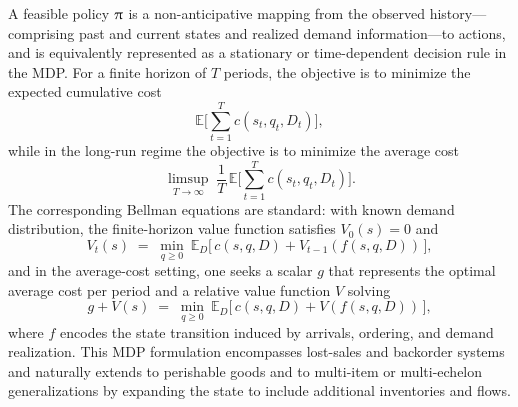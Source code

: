 A feasible policy $\uppi$ is a non-anticipative mapping from the observed history—comprising past and current states and realized demand information—to actions, and is equivalently represented as a stationary or time-dependent decision rule in the MDP. For a finite horizon of $T$ periods, the objective is to minimize the expected cumulative cost 
$$
\mathds{E}\Bigg[\sum_{t=1}^T c(s_t, q_t, D_t)\Bigg],
$$ 
while in the long-run regime the objective is to minimize the average cost 
\[
\limsup_{T\to\infty} \; \frac{1}{T} \,\mathds{E}\Bigg[\sum_{t=1}^T c(s_t, q_t, D_t)\Bigg].
\]
The corresponding Bellman equations are standard: with known demand distribution, the finite-horizon value function satisfies $V_0(s) = 0$ and
\[
V_t(s) \;=\; \min_{q \ge 0} \ \mathds{E}_D\big[\, c(s, q, D) + V_{t-1}(f(s, q, D)) \,\big],
\]
and in the average-cost setting, one seeks a scalar $g$ that represents the optimal average cost per period and a relative value function $V$ solving
\[
g + V(s) \;=\; \min_{q \ge 0} \ \mathds{E}_D\big[\, c(s, q, D) + V(f(s, q, D)) \,\big],
\]
where $f$ encodes the state transition induced by arrivals, ordering, and demand realization. This MDP formulation encompasses lost-sales and backorder systems and naturally extends to perishable goods and to multi-item or multi-echelon generalizations by expanding the state to include additional inventories and flows.











